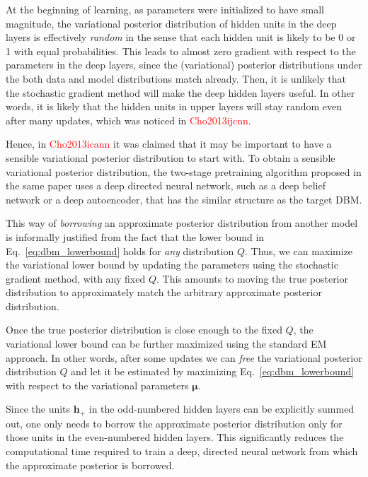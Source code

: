 \documentclass{now}
\newcommand{\vect}[1]{\mathbf{#1}}
\newcommand{\vects}[1]{\boldsymbol{#1}}
\newcommand{\vh}[0]{\vect{h}}
\newcommand{\vmu}[0]{\vects{\mu}}
\newcommand{\alert}[1]{\textcolor{red}{#1}}
\newcommand{\citepub}[1]{\alert{#1}}
\begin{document}
At the beginning of learning, as parameters were initialized
to have small magnitude, the variational posterior
distribution of hidden units in the deep layers is
effectively \textit{random} in the sense that each hidden unit
is likely to be 0 or 1 with equal probabilities. This leads
to almost zero gradient with respect to the parameters in
the deep layers, since the (variational) posterior
distributions under the both data and model distributions
match already. Then, it is unlikely that the stochastic
gradient method will make the deep hidden layers useful. In
other words, it is likely that the hidden units in upper
layers will stay random even after many updates, which was
noticed in \citepub{Cho2013ijcnn}.

Hence, in \citepub{Cho2013icann} it was claimed that it may
be important to have a sensible variational posterior
distribution to start with. To obtain a sensible variational
posterior distribution, the two-stage pretraining algorithm
proposed in the same paper uses a deep directed
neural network, such as a deep belief network or a deep
autoencoder, that has the similar structure as the target
DBM.

This way of \textit{borrowing} an approximate posterior
distribution from another model is informally justified from
the fact that the lower bound in
Eq.~\eqref{eq:dbm_lowerbound} holds for \textit{any}
distribution $Q$. Thus, we can maximize the variational
lower bound by updating the parameters using the stochastic
gradient method, with any fixed $Q$. This amounts to moving
the true posterior distribution to approximately match the
arbitrary approximate posterior distribution.

Once the true posterior distribution is close enough to the
fixed $Q$, the variational lower bound can be further
maximized using the standard EM approach. In other words,
after some updates we can \textit{free} the variational
posterior distribution $Q$ and let it be estimated by
maximizing Eq.~\eqref{eq:dbm_lowerbound} with respect to the
variational parameters $\vmu$.

Since the units $\vh_+$
in the odd-numbered hidden layers can be explicitly summed
out, one only needs to borrow the approximate
posterior distribution only for those units in the
even-numbered hidden layers. This significantly reduces the
computational time required to train a deep, directed neural
network from which the approximate posterior is borrowed.
\end{document}
